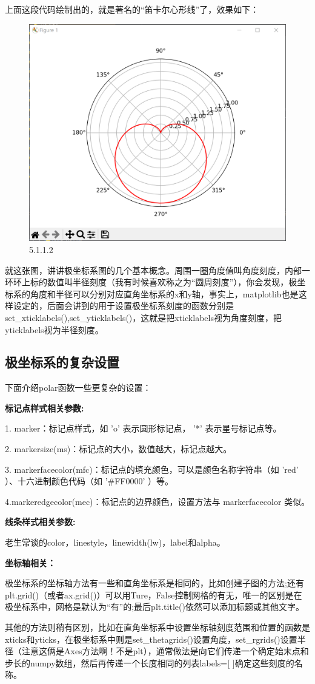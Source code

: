 \documentclass[12pt]{article}
\begin{document}
上面这段代码绘制出的，就是著名的“笛卡尔心形线”了，效果如下：
\begin{figure}[H]
    \centering
    \includegraphics[width=0.5\linewidth]{极坐标 Pic1.png}
    \caption{5.1.1.2}
    \label{fig:enter-label}
\end{figure}
就这张图，讲讲极坐标系图的几个基本概念。周围一圈角度值叫角度刻度，内部一环环上标的数值叫半径刻度（我有时候喜欢称之为“圆周刻度”），你会发现，极坐标系的角度和半径可以分别对应直角坐标系的x和y轴，事实上，matplotlib也是这样设定的，后面会讲到的用于设置极坐标系刻度的函数分别是set\_xticklabels(),set\_yticklabels()，这就是把xticklabels视为角度刻度，把yticklabels视为半径刻度。
\subsection{极坐标系的复杂设置}
\noindent 下面介绍polar函数一些更复杂的设置：

\noindent \textbf{标记点样式相关参数:}

1. marker：标记点样式，如   'o'   表示圆形标记点，  '*'   表示星号标记点等。

2. markersize(ms)：标记点的大小，数值越大，标记点越大。

3. markerfacecolor(mfc)：标记点的填充颜色，可以是颜色名称字符串（如   'red'  ）、十六进制颜色代码（如   '\#FF0000'  ）等。

4.markeredgecolor(mec)：标记点的边界颜色，设置方法与   markerfacecolor   类似。

\noindent \textbf{线条样式相关参数:}

老生常谈的color，linestyle，linewidth(lw)，label和alpha。

\noindent \textbf{坐标轴相关：}

极坐标系的坐标轴方法有一些和直角坐标系是相同的，比如创建子图的方法;还有plt.grid()（或者ax.grid()）可以用Ture，False控制网格的有无，唯一的区别是在极坐标系中，网格是默认为“有”的;最后plt.title()依然可以添加标题或其他文字。

其他的方法则稍有区别，比如在直角坐标系中设置坐标轴刻度范围和位置的函数是xticks和yticks，在极坐标系中则是set\_thetagrids()设置角度，set\_rgrids()设置半径（注意这俩是Axes方法啊！不是plt），通常做法是向它们传递一个确定始末点和步长的numpy数组，然后再传递一个长度相同的列表labels=[ ]确定这些刻度的名称。
\end{document}
